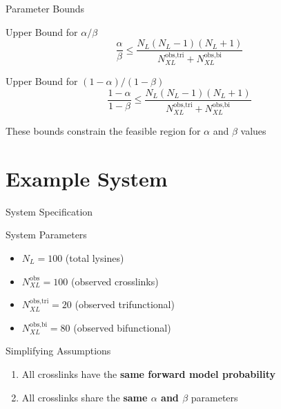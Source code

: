 \documentclass{beamer}
\begin{document}
\begin{frame}{Parameter Bounds}
\begin{block}{Upper Bound for $\alpha/\beta$}
\begin{equation}
    \frac{\alpha}{\beta} \leq \frac{N_L(N_L-1)(N_L+1)}{N^{\text{obs,tri}}_{XL}+N^{\text{obs,bi}}_{XL}}
\end{equation}
\end{block}

\vspace{0.3cm}

\begin{block}{Upper Bound for $(1-\alpha)/(1-\beta)$}
\begin{equation}
    \frac{1-\alpha}{1-\beta} \leq \frac{N_L(N_L-1)(N_L+1)}{N^{\text{obs,tri}}_{XL}+N^{\text{obs,bi}}_{XL}}
\end{equation}
\end{block}

\vspace{0.3cm}
\small{These bounds constrain the feasible region for $\alpha$ and $\beta$ values}
\end{frame}

\section{Example System}

\begin{frame}{System Specification}
\begin{exampleblock}{System Parameters}
\begin{itemize}
    \item $N_L = 100$ (total lysines)
    \item $N^{\text{obs}}_{XL} = 100$ (observed crosslinks)
    \item $N^{\text{obs,tri}}_{XL} = 20$ (observed trifunctional)
    \item $N^{\text{obs,bi}}_{XL} = 80$ (observed bifunctional)
\end{itemize}
\end{exampleblock}

\vspace{0.5cm}

\begin{block}{Simplifying Assumptions}
\begin{enumerate}
    \item All crosslinks have the \textbf{same forward model probability}
    \item All crosslinks share the \textbf{same $\alpha$ and $\beta$} parameters
\end{enumerate}
\end{block}
\end{frame}
\end{document}
